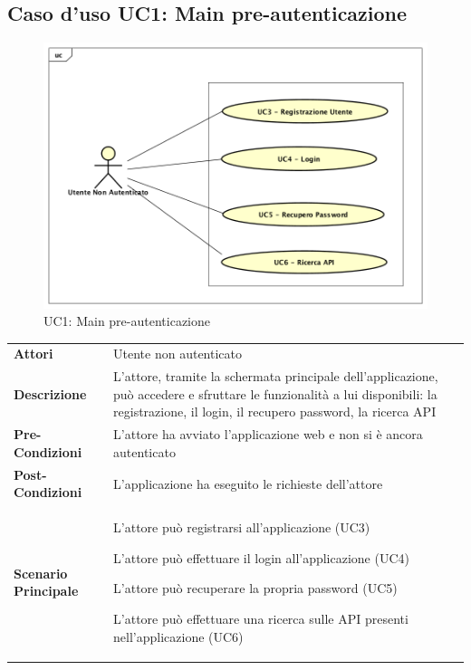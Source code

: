 \newpage
\subsection{Caso d'uso UC1: Main pre-autenticazione }
\label{UC1}
\begin{figure}[ht]
	\centering
	\includegraphics[scale=0.45]{UML/UC1.png}
	\caption{UC1: Main pre-autenticazione}
\end{figure}

\renewcommand*{\arraystretch}{1.6}
\begin{longtable}{ l | p{11cm}}
	\hline
	\rowcolor{Gray}
	 \multicolumn{2}{c}{UC1 - Main pre-autenticazione} \\
	 \hline
	\textbf{Attori} & Utente non autenticato  \\
	\textbf{Descrizione} & L'attore, tramite la schermata principale dell'applicazione, può accedere e sfruttare le funzionalità a lui disponibili: la registrazione, il login, il recupero password, la ricerca API  \\
	\textbf{Pre-Condizioni} & L'attore ha avviato l'applicazione web e non si è ancora autenticato \\
	\textbf{Post-Condizioni} & L'applicazione ha eseguito le richieste dell'attore\\
	\textbf{Scenario Principale} & \begin{enumerate*}[label=(\arabic*.),itemjoin={\newline}]
		\item L'attore può registrarsi all'applicazione (UC3)
		\item L'attore può effettuare il login all'applicazione (UC4)
		\item L'attore può recuperare la propria password (UC5)
		\item L'attore può effettuare una ricerca sulle API presenti nell'applicazione (UC6)
	\end{enumerate*}\\
\end{longtable}